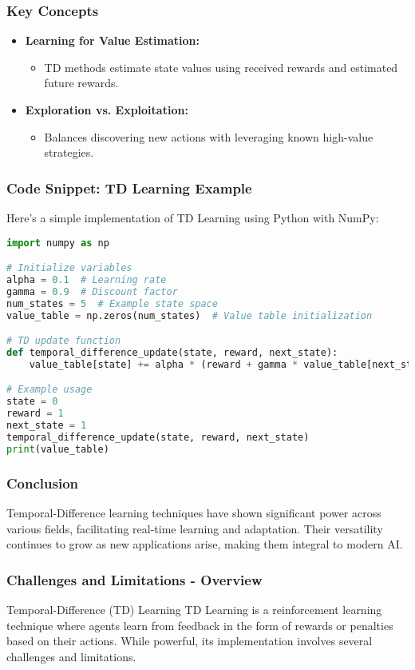\documentclass[aspectratio=169]{beamer}
\begin{document}
\begin{frame}[fragile]
    \frametitle{Key Concepts}
    \begin{itemize}
        \item \textbf{Learning for Value Estimation:} 
        \begin{itemize}
            \item TD methods estimate state values using received rewards and estimated future rewards.
        \end{itemize}
        
        \item \textbf{Exploration vs. Exploitation:}
        \begin{itemize}
            \item Balances discovering new actions with leveraging known high-value strategies.
        \end{itemize}
    \end{itemize}
\end{frame}

\begin{frame}[fragile]
    \frametitle{Code Snippet: TD Learning Example}
    Here’s a simple implementation of TD Learning using Python with NumPy:
    
    \begin{lstlisting}[language=Python]
import numpy as np

# Initialize variables
alpha = 0.1  # Learning rate
gamma = 0.9  # Discount factor
num_states = 5  # Example state space
value_table = np.zeros(num_states)  # Value table initialization

# TD update function
def temporal_difference_update(state, reward, next_state):
    value_table[state] += alpha * (reward + gamma * value_table[next_state] - value_table[state])

# Example usage
state = 0
reward = 1
next_state = 1
temporal_difference_update(state, reward, next_state)
print(value_table)
    \end{lstlisting}
\end{frame}

\begin{frame}
    \frametitle{Conclusion}
    Temporal-Difference learning techniques have shown significant power across various fields, facilitating real-time learning and adaptation. Their versatility continues to grow as new applications arise, making them integral to modern AI.
\end{frame}

\begin{frame}[fragile]
    \frametitle{Challenges and Limitations - Overview}
    \begin{block}{Temporal-Difference (TD) Learning}
        TD Learning is a reinforcement learning technique where agents learn from feedback in the form of rewards or penalties based on their actions. While powerful, its implementation involves several challenges and limitations.
    \end{block}
\end{frame}
\end{document}
